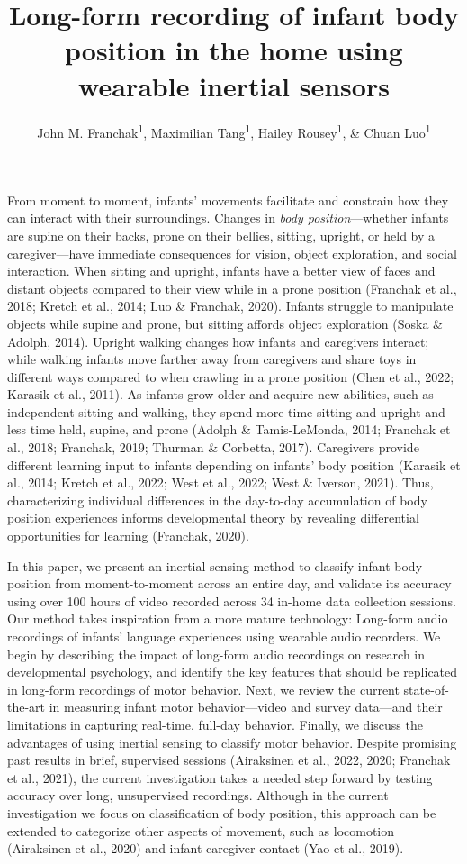 \documentclass[
  man]{apa6}
\title{Long-form recording of infant body position in the home using wearable inertial sensors}
\author{John M. Franchak\textsuperscript{1}, Maximilian Tang\textsuperscript{1}, Hailey Rousey\textsuperscript{1}, \& Chuan Luo\textsuperscript{1}}
\date{}
\affiliation{\phantom{0}}
\begin{document}
\maketitle

From moment to moment, infants' movements facilitate and constrain how they can interact with their surroundings. Changes in \emph{body position}---whether infants are supine on their backs, prone on their bellies, sitting, upright, or held by a caregiver---have immediate consequences for vision, object exploration, and social interaction. When sitting and upright, infants have a better view of faces and distant objects compared to their view while in a prone position (Franchak et al., 2018; Kretch et al., 2014; Luo \& Franchak, 2020). Infants struggle to manipulate objects while supine and prone, but sitting affords object exploration (Soska \& Adolph, 2014). Upright walking changes how infants and caregivers interact; while walking infants move farther away from caregivers and share toys in different ways compared to when crawling in a prone position (Chen et al., 2022; Karasik et al., 2011). As infants grow older and acquire new abilities, such as independent sitting and walking, they spend more time sitting and upright and less time held, supine, and prone (Adolph \& Tamis-LeMonda, 2014; Franchak et al., 2018; Franchak, 2019; Thurman \& Corbetta, 2017). Caregivers provide different learning input to infants depending on infants' body position (Karasik et al., 2014; Kretch et al., 2022; West et al., 2022; West \& Iverson, 2021). Thus, characterizing individual differences in the day-to-day accumulation of body position experiences informs developmental theory by revealing differential opportunities for learning (Franchak, 2020).

In this paper, we present an inertial sensing method to classify infant body position from moment-to-moment across an entire day, and validate its accuracy using over 100 hours of video recorded across 34 in-home data collection sessions. Our method takes inspiration from a more mature technology: Long-form audio recordings of infants' language experiences using wearable audio recorders. We begin by describing the impact of long-form audio recordings on research in developmental psychology, and identify the key features that should be replicated in long-form recordings of motor behavior. Next, we review the current state-of-the-art in measuring infant motor behavior---video and survey data---and their limitations in capturing real-time, full-day behavior. Finally, we discuss the advantages of using inertial sensing to classify motor behavior. Despite promising past results in brief, supervised sessions (Airaksinen et al., 2022, 2020; Franchak et al., 2021), the current investigation takes a needed step forward by testing accuracy over long, unsupervised recordings. Although in the current investigation we focus on classification of body position, this approach can be extended to categorize other aspects of movement, such as locomotion (Airaksinen et al., 2020) and infant-caregiver contact (Yao et al., 2019).
\end{document}
